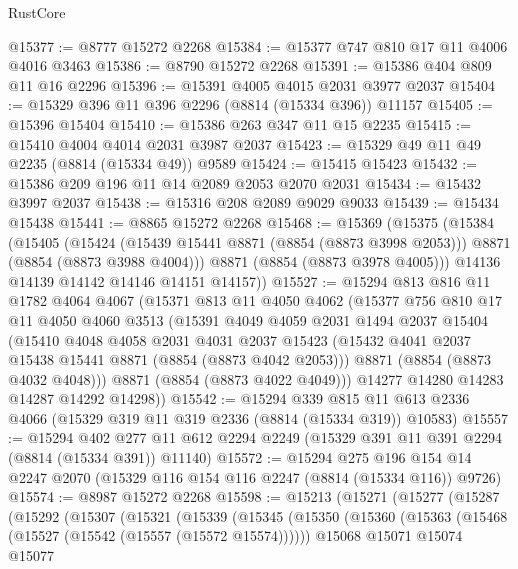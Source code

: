 \begin{lexlean}{RustCore}
\begin{coremodule}
@15377 := @8777 @15272 @2268
@15384 := @15377 @747 @810 @17 @11 @4006 @4016 @3463
@15386 := @8790 @15272 @2268
@15391 := @15386 @404 @809 @11 @16 @2296
@15396 := @15391 @4005 @4015 @2031 @3977 @2037
@15404 := @15329 @396 @11 @396 @2296 (@8814 (@15334 @396)) @11157
@15405 := @15396 @15404
@15410 := @15386 @263 @347 @11 @15 @2235
@15415 := @15410 @4004 @4014 @2031 @3987 @2037
@15423 := @15329 @49 @11 @49 @2235 (@8814 (@15334 @49)) @9589
@15424 := @15415 @15423
@15432 := @15386 @209 @196 @11 @14 @2089 @2053 @2070 @2031
@15434 := @15432 @3997 @2037
@15438 := @15316 @208 @2089 @9029 @9033
@15439 := @15434 @15438
@15441 := @8865 @15272 @2268
@15468 := @15369
    (@15375
      (@15384
        (@15405
          (@15424
            (@15439 @15441 @8871 (@8854 (@8873 @3998 @2053)))
            @8871
            (@8854 (@8873 @3988 @4004)))
          @8871
          (@8854 (@8873 @3978 @4005)))
        @14136
        @14139
        @14142
        @14146
        @14151
        @14157))
@15527 := @15294
    @813
    @816
    @11
    @1782
    @4064
    @4067
    (@15371
      @813
      @11
      @4050
      @4062
      (@15377
        @756
        @810
        @17
        @11
        @4050
        @4060
        @3513
        (@15391
          @4049
          @4059
          @2031
          @1494
          @2037
          @15404
          (@15410
            @4048
            @4058
            @2031
            @4031
            @2037
            @15423
            (@15432 @4041 @2037 @15438 @15441 @8871 (@8854 (@8873 @4042 @2053)))
            @8871
            (@8854 (@8873 @4032 @4048)))
          @8871
          (@8854 (@8873 @4022 @4049)))
        @14277
        @14280
        @14283
        @14287
        @14292
        @14298))
@15542 := @15294
    @339
    @815
    @11
    @613
    @2336
    @4066
    (@15329 @319 @11 @319 @2336 (@8814 (@15334 @319)) @10583)
@15557 := @15294
    @402
    @277
    @11
    @612
    @2294
    @2249
    (@15329 @391 @11 @391 @2294 (@8814 (@15334 @391)) @11140)
@15572 := @15294
    @275
    @196
    @154
    @14
    @2247
    @2070
    (@15329 @116 @154 @116 @2247 (@8814 (@15334 @116)) @9726)
@15574 := @8987 @15272 @2268
@15598 := @15213
    (@15271
      (@15277
        (@15287
          (@15292
            (@15307
              (@15321
                (@15339
                  (@15345
                    (@15350
                      (@15360
                        (@15363 (@15468 (@15527 (@15542 (@15557 (@15572 @15574))))))
                        @15068
                        @15071
                        @15074
                        @15077

\end{coremodule}
\end{lexlean}
